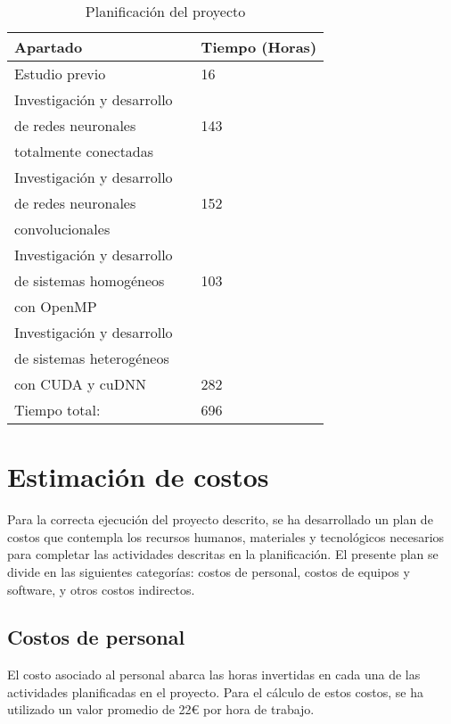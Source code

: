 \begin{table}[H]
	\centering
	\begin{tabular}{|lll|}
		\hline
		Apartado 	 &\vline  & Tiempo (Horas) \\
		\hline
		
		Estudio previo    & \vline & 16 \\			
		\hline
		Investigación y desarrollo  	 & \vline & 	\\
		de redes neuronales  	 & \vline & 143	\\
		totalmente conectadas 	 & \vline & 	\\
		\hline
		Investigación y desarrollo    & \vline & 	 \\	
		de redes neuronales    & \vline & 152	 \\			
		convolucionales    & \vline & 	 \\					
		\hline
		Investigación y desarrollo  	 & \vline & 	 \\
		de sistemas homogéneos  	 & \vline & 103	 \\
		con OpenMP 	 & \vline & 	 \\
		\hline
		Investigación y desarrollo     & \vline &  	\\
		de sistemas heterogéneos    & \vline &  \\ 
		con CUDA y cuDNN    & \vline & 282 \\ 	
		\hline
		\hline
		Tiempo total:				& \vline & 696 \\
		\hline
	\end{tabular}
	\caption{Planificación del proyecto}
	\label{tabla_planificación}
\end{table}

\section{Estimación de costos}

Para la correcta ejecución del proyecto descrito, se ha desarrollado un plan de costos que contempla los recursos humanos, materiales y tecnológicos necesarios para completar las actividades descritas en la planificación. El presente plan se divide en las siguientes categorías: costos de personal, costos de equipos y software, y otros costos indirectos.

\subsection{Costos de personal}

El costo asociado al personal abarca las horas invertidas en cada una de las actividades planificadas en el proyecto. Para el cálculo de estos costos, se ha utilizado un valor promedio de 22€ por hora de trabajo.

